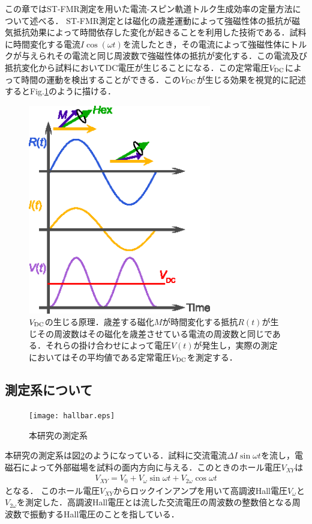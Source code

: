 この章ではST-FMR測定を用いた電流-スピン軌道トルク生成効率の定量方法について述べる．
ST-FMR測定とは磁化の歳差運動によって強磁性体の抵抗が磁気抵抗効果によって時間依存した変化が起きることを利用した技術である．試料に時間変化する電流$I\cos (\omega t)$を流したとき，その電流によって強磁性体にトルクが与えられその電流と同じ周波数で強磁性体の抵抗が変化する．この電流及び抵抗変化から試料においてDC電圧が生じることになる．この定常電圧$V_{\rm DC}$によって時間の運動を検出することができる．この$V_{\rm DC}$が生じる効果を視覚的に記述するとFig.\ref{fig:frequencymix}のように描ける．

\begin{figure}[htbp]
 \begin{center}
  \includegraphics[width=8cm]{images/frequencymix.eps}
 \end{center}
 \caption{$V_{\rm DC}$の生じる原理．歳差する磁化$M$が時間変化する抵抗$R(t)$が生じその周波数はその磁化を歳差させている電流の周波数と同じである．それらの掛け合わせによって電圧$V(t)$が発生し，実際の測定においてはその平均値である定常電圧$V_{\rm DC}$を測定する．}
 \label{fig:frequencymix}
\end{figure}

\subsection{測定系について}

\begin{figure}[htbp]
 \begin{center}
  \texttt{[image: hallbar.eps]}
 \end{center}
 \caption{本研究の測定系}
 \label{fig:setup}
\end{figure}
本研究の測定系は図\ref{fig:setup}のようになっている．試料に交流電流$\Delta I\sin\omega t$を流し，電磁石によって外部磁場を試料の面内方向に与える．このときのホール電圧$V_{XY}$は
\begin{eqnarray}
V_{XY} = V_{0}+V_{\omega}\sin\omega t + V_{2\omega}\cos\omega t
\label{eq:Vxy}
\end{eqnarray}
となる．
このホール電圧$V_{XY}$からロックインアンプを用いて高調波Hall電圧$V_{\omega}$と$V_{2\omega}$を測定した．高調波Hall電圧とは流した交流電圧の周波数の整数倍となる周波数で振動するHall電圧のことを指している．

